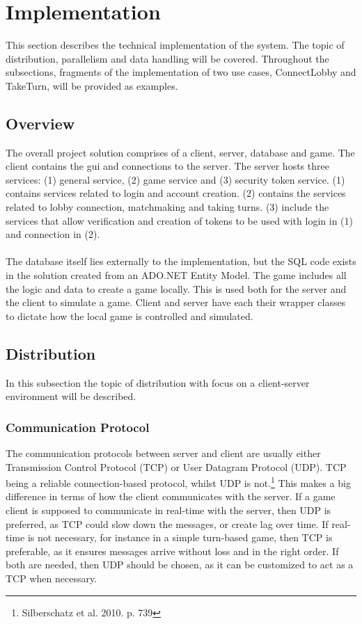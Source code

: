 \chapter {Implementation}
This section describes the technical implementation of the system.
The topic of distribution, parallelism and data handling will be covered.
 Throughout the subsections, fragments of the implementation of two use cases,
  ConnectLobby and TakeTurn, will be provided as examples.

\section {Overview}

The overall project solution comprises of a client, server, database and game.
 The client contains the gui and connections to the server. The server hosts
  three services: (1) general service, (2) game service and (3) security token
   service. (1) contains services related to login and account creation. (2)
   contains the services related to lobby connection, matchmaking and taking
    turns. (3) include the services that allow verification and creation of
     tokens to be used with login in (1) and connection in (2).
\\\\
The database itself lies externally to the implementation, but the SQL code
 exists in the solution created from an ADO.NET Entity Model. The game
 includes all the logic and data to create a game locally. This is used
 both for the server and the client to simulate a game. Client and server
  have each their wrapper classes to dictate how the local game is
   controlled and simulated.

\section {Distribution}
In this subsection the topic of distribution with focus on a client-server
 environment will be described.

\subsection {Communication Protocol}
The communication protocols between server and client are usually either
 Transmission Control Protocol (TCP) or User Datagram Protocol (UDP).
 TCP being a reliable connection-based protocol, whilst UDP is
  not.\footnote{Silberschatz et al. 2010. p. 739} This makes a big
   difference in terms of how the client communicates with the server.
    If a game client is supposed to communicate in real-time with the server,
     then UDP is preferred, as TCP could slow down the messages, or create
      lag over time. If real-time is not necessary, for instance in a simple
       turn-based game, then TCP is preferable, as it ensures messages arrive
        without loss and in the right order. If both are needed, then UDP
        should be chosen, as it can be customized to act as a TCP
         when necessary.

